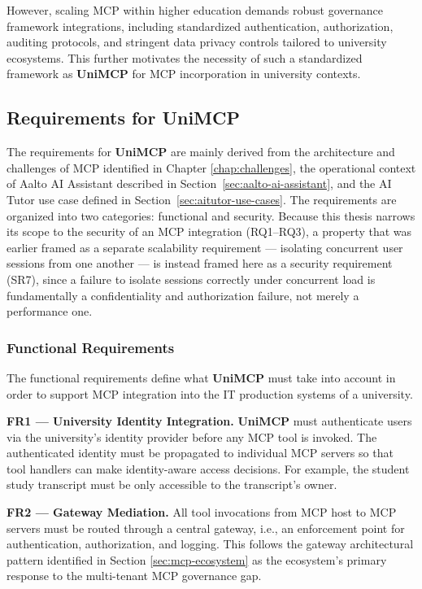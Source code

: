 \documentclass[english, 12pt, a4paper, elec, utf8, a-2b, online]{aaltothesis}
\newcommand{\UniMCP}{\textbf{UniMCP}\xspace}
\begin{document}
However, scaling MCP within higher education demands robust governance framework integrations, including standardized authentication, authorization, auditing protocols, and stringent data privacy controls tailored to university ecosystems.
This further motivates the necessity of such a standardized framework as \UniMCP for MCP incorporation in university contexts.

\subsection{Requirements for \UniMCP}
\label{sec:requirements}

The requirements for \UniMCP are mainly derived from the architecture and challenges of MCP identified in Chapter \ref{chap:challenges}, the operational context of Aalto AI Assistant described in Section~\ref{sec:aalto-ai-assistant},  and the AI Tutor use case defined in Section~\ref{sec:aitutor-use-cases}.
The requirements are organized into two categories: functional and security. Because this thesis
narrows its scope to the security of an MCP integration (RQ1--RQ3), a property that was earlier framed
as a separate scalability requirement --- isolating concurrent user sessions from one another --- is
instead framed here as a security requirement (SR7), since a failure to isolate sessions correctly
under concurrent load is fundamentally a confidentiality and authorization failure, not merely a
performance one.

\subsubsection{Functional Requirements}
The functional requirements define what \UniMCP must take into account in order to support MCP integration into the IT production systems of a university.
 
\textbf{FR1 --- University Identity Integration.}
\UniMCP must authenticate users via the university's identity provider before any MCP tool is invoked.
The authenticated identity must be propagated to individual MCP servers so that tool handlers can make identity-aware access decisions. 
For example, the student study transcript must be only accessible to the transcript's owner.

\textbf{FR2 --- Gateway Mediation.}
All tool invocations from MCP host to MCP servers must be routed through a central gateway, i.e., an enforcement point for authentication, authorization, and logging.
This follows the gateway architectural pattern identified in Section \ref{sec:mcp-ecosystem} as the ecosystem's primary response to the multi-tenant MCP governance gap.
\end{document}
